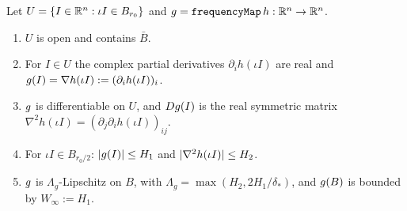 \begin{lemma}\label{bp:p4:freq-map}
Let $U=\{I\in\mathbb{R}^n:\iota I\in B_{r_0}\}$ and $g=\texttt{frequencyMap}\,h:\mathbb{R}^n\to\mathbb{R}^n$.
\begin{enumerate}[label=(\roman*)]
\item $U$ is open and contains $\bar B$.
\item For $I\in U$ the complex partial derivatives $\partial_ih(\iota I)$ are real and
  $g(I)=\nabla h(\iota I):=(\partial_ih(\iota I))_{i}$.
\item $g$ is differentiable on $U$, and $Dg(I)$ is the real symmetric matrix
  $\nabla^2h(\iota I)=(\partial_j\partial_ih(\iota I))_{ij}$.
\item For $\iota I\in B_{r_0/2}$: $\lvert g(I)\rvert\le H_1$ and $\lvert \nabla^2h(\iota I)\rvert\le H_2$.
\item $g$ is $\Lambda_g$-Lipschitz on $B$, with $\Lambda_g=\max(H_2,2H_1/\delta_*)$, and
  $g(B)$ is bounded by $W_\infty:=H_1$.
\end{enumerate}
\end{lemma}

